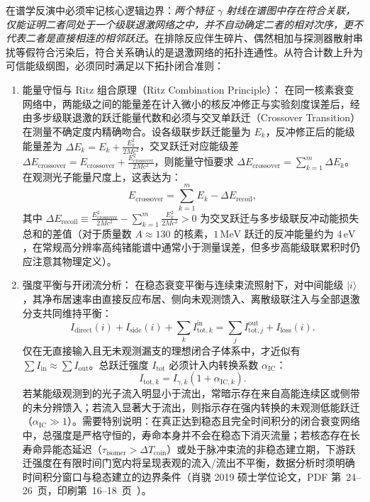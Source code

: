 在谱学反演中必须牢记核心逻辑边界：\emph{两个特征 $\gamma$ 射线在谱图中存在符合关联，仅能证明二者同处于一个级联退激网络之中，并不自动确定二者的相对次序，更不代表二者是直接相连的相邻跃迁}。在排除反应伴生碎片、偶然相加与探测器散射串扰等假符合污染后，符合关系确认的是退激网络的拓扑连通性。从符合计数上升为可信能级纲图，必须同时满足以下拓扑闭合准则：
\begin{enumerate}
\item 能量守恒与 Ritz 组合原理（Ritz Combination Principle）：
在同一核素衰变网络中，两能级之间的能量差在计入微小的核反冲修正与实验刻度误差后，经由多步级联退激的跃迁能量代数和必须与交叉单跃迁（Crossover Transition）在测量不确定度内精确吻合。设各级联步跃迁能量为 $E_k$，反冲修正后的能级能量差为 $\Delta E_k = E_k + \frac{E_k^2}{2 M c^2}$，交叉跃迁对应能级差 $\Delta E_{\mathrm{crossover}} = E_{\mathrm{crossover}} + \frac{E_{\mathrm{crossover}}^2}{2 M c^2}$，则能量守恒要求 $\Delta E_{\mathrm{crossover}} = \sum_{k=1}^m \Delta E_k$。在观测光子能量尺度上，这表达为：
\begin{equation}\label{eq:5-6-ritz-combination}
E_{\mathrm{crossover}} = \sum_{k=1}^m E_k - \Delta E_{\mathrm{recoil}},
\end{equation}
其中 $\Delta E_{\mathrm{recoil}} \equiv \frac{E_{\mathrm{crossover}}^2}{2 M c^2} - \sum_{k=1}^m \frac{E_k^2}{2 M c^2} > 0$ 为交叉跃迁与多步级联反冲动能损失总和的差值（对于质量数 $A \approx 130$ 的核素，$1\,\text{MeV}$ 跃迁的反冲能量约为 $4\,\text{eV}$，在常规高分辨率高纯锗能谱中通常小于测量误差，但多步高能级联累积时仍应注意其物理定义）。
\item 强度平衡与开闭流分析：
在稳态衰变平衡与连续束流照射下，对中间能级 $|i\rangle$，其净布居速率由直接反应布居、侧向未观测馈入、离散级联注入与全部退激分支共同维持平衡：
\begin{equation}\label{eq:5-6-intensity-balance}
I_{\mathrm{direct}}(i) + I_{\mathrm{side}}(i) + \sum_{k} I_{\mathrm{tot}, k}^{\mathrm{in}} = \sum_{j} I_{\mathrm{tot}, j}^{\mathrm{out}} + I_{\mathrm{loss}}(i).
\end{equation}
仅在无直接输入且无未观测漏支的理想闭合子体系中，才近似有 $\sum I_{\mathrm{in}} \approx \sum I_{\mathrm{out}}$。总跃迁强度 $I_{\mathrm{tot}}$ 必须计入内转换系数 $\alpha_{\mathrm{IC}}$：
\begin{equation}\label{eq:5-6-itot-expansion}
I_{\mathrm{tot}, k} = I_{\gamma, k} (1 + \alpha_{\mathrm{IC}, k}).
\end{equation}
若某能级观测到的光子流入明显小于流出，常暗示存在来自高能连续区或侧带的未分辨馈入；若流入显著大于流出，则指示存在强内转换的未观测低能跃迁（$\alpha_{\mathrm{IC}} \gg 1$）。需要特别说明：在真正达到稳态且完全时间积分的闭合衰变网络中，总强度是严格守恒的，寿命本身并不会在稳态下消灭流量；若核态存在长寿命异能态延迟（$\tau_{\mathrm{isomer}} > \Delta T_{\mathrm{coin}}$）或处于脉冲束流的非稳态建立期，下游跃迁强度在有限时间门宽内将呈现表观的流入/流出不平衡，数据分析时须明确时间积分窗口与稳态建立的边界条件（肖骁 2019 硕士学位论文，PDF 第~24--26~页，印刷第~16--18~页~\cite{xiao-xiao-2019-high-spin-74as-thesis}）。

\end{enumerate}
